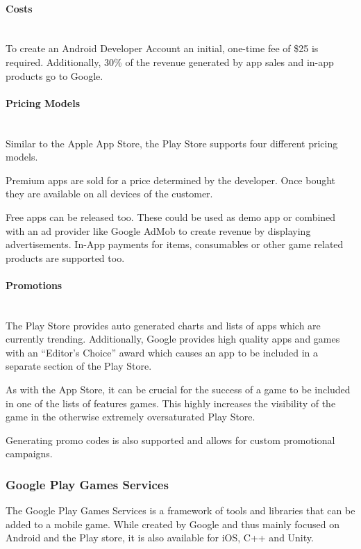 \paragraph{Costs}\mbox{}\\
To create an Android Developer Account an initial, one-time fee of \$25 is required. Additionally, 30\% of the revenue generated by app sales and in-app products go to Google.

\paragraph{Pricing Models}\mbox{}\\
Similar to the Apple App Store, the Play Store supports four different pricing models. 

Premium apps are sold for a price determined by the developer. Once bought they are available on all devices of the customer.

Free apps can be released too. These could be used as demo app or combined with an ad provider like Google AdMob to create revenue by displaying advertisements. In-App payments for items, consumables or other game related products are supported too.

\paragraph{Promotions}\mbox{}\\
The Play Store provides auto generated charts and lists of apps which are currently trending. Additionally, Google provides high quality apps and games with an “Editor’s Choice” award which causes an app to be included in a separate section of the Play Store.

As with the App Store, it can be crucial for the success of a game to be included in one of the lists of features games. This highly increases the visibility of the game in the otherwise extremely oversaturated Play Store. 

Generating promo codes is also supported and allows for custom promotional campaigns.

\subsubsection{Google Play Games Services}
\label{subsec:android_play_services}
The Google Play Games Services is a framework of tools and libraries that can be added to a mobile game. While created by Google and thus mainly focused on Android and the Play store, it is also available for iOS, C++ and Unity.

